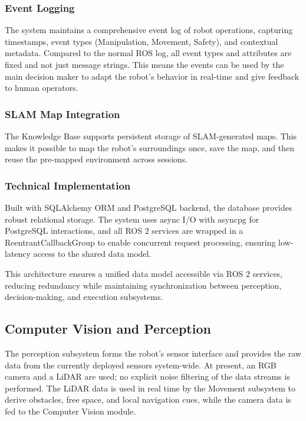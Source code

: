 \subsubsection{Event Logging}
The system maintains a comprehensive event log of robot operations, capturing timestamps, event types (Manipulation, Movement, Safety), and contextual metadata.
Compared to the normal ROS log, all event types and attributes are fixed and not just message strings.
This means the events can be used by the main decision maker to adapt the robot's behavior in real-time and give feedback to human operators.

\subsubsection{SLAM Map Integration}
The Knowledge Base supports persistent storage of SLAM-generated maps. This makes it possible to map the robot's surroundings once, save the map, and then reuse the pre-mapped environment across sessions.

\subsubsection{Technical Implementation}
Built with SQLAlchemy ORM\cite{sqlalchemy} and PostgreSQL\cite{postgresql} backend, the database provides robust relational storage. The system uses async I/O with asyncpg\cite{asyncpg} for PostgreSQL interactions, and all ROS 2 services are wrapped in a ReentrantCallbackGroup to enable concurrent request processing, ensuring low-latency access to the shared data model.

\vspace{3mm}

This architecture ensures a unified data model accessible via ROS 2 services, reducing redundancy while maintaining synchronization between perception, decision-making, and execution subsystems.

\subsection {Computer Vision and Perception}
The perception subsystem forms the robot's sensor interface and provides the raw data from the currently deployed sensors system-wide. At present, an RGB camera and a LiDAR are used; no explicit noise filtering of the data streams is performed. The LiDAR data is used in real time by the Movement subsystem to derive obstacles, free space, and local navigation cues, while the camera data is fed to the Computer Vision module.

